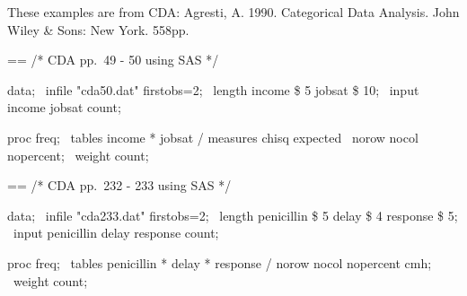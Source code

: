 \documentclass{book}
\makeatletter
\newenvironment{Texinfopreformatted}{%
  \par\GNUTobeylines\obeyspaces\frenchspacing\parskip=\z@\parindent=\z@}{}
{\catcode`\^^M=13 \gdef\GNUTobeylines{\catcode`\^^M=13 \def^^M{\null\par}}}
\newenvironment{Texinfoindented}{\begin{list}{}{}\item\relax}{\end{list}}
\renewcommand{\_}{\Texinfounderscore\discretionary{}{}{}}
\makeatother
\begin{document}
These examples are from CDA: Agresti, A.  1990.  Categorical Data Analysis.
John Wiley \& Sons: New York.  558pp.

\begin{Texinfoindented}
\begin{Texinfopreformatted}%
\ttfamily /* CDA pp.\ 49 - 50 using SAS */

data;
\ infile "cda50.dat" firstobs=2;
\ length income \$ 5 jobsat \$ 10;
\ input income jobsat count;

proc freq;
\ tables income * jobsat / measures chisq expected
\                          norow nocol nopercent;
\ weight count;

\end{Texinfopreformatted}
\end{Texinfoindented}

\begin{Texinfoindented}
\begin{Texinfopreformatted}%
\ttfamily /* CDA pp.\ 232 - 233 using SAS */

data;
\ infile "cda233.dat" firstobs=2;
\ length penicillin \$ 5 delay \$ 4 response \$ 5;
\ input penicillin delay response count;

proc freq;
\ tables penicillin * delay * response / norow nocol nopercent cmh;
\ weight count;


\end{Texinfopreformatted}
\end{Texinfoindented}
\end{document}

